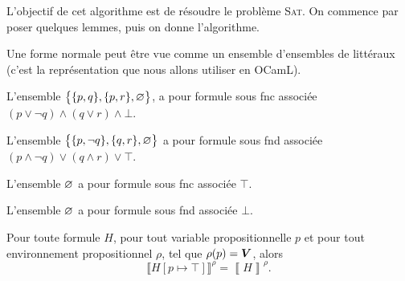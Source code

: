 L'objectif de cet algorithme est de résoudre le problème \textsc{Sat}. On commence par poser quelques lemmes, puis on donne l'algorithme.

\begin{rmk}
	Une forme normale peut être vue comme un ensemble d'ensembles de littéraux (c'est la représentation que nous allons utiliser en OCamL).
\end{rmk}

\begin{exm}\hfill
	\begin{multicols}{1}
		L'ensemble $\big\{\{p,q\},\{p,r\}, \varnothing\big\}$, a pour formule sous {\sc fnc}\/ associée $(p\lor \lnot q) \land (q \lor r) \land \bot$.

		L'ensemble $\big\{\{p,\lnot q\}, \{q,r\}, \varnothing\big\}$\/ a pour formule sous {\sc fnd}\/ associée $(p \land \lnot q) \lor (q \land r) \lor \top$.

		L'ensemble $\varnothing$\/ a pour formule sous {\sc fnc}\/ associée $\top$.

		L'ensemble $\varnothing$\/ a pour formule sous {\sc fnd}\/ associée $\bot$.
	\end{multicols}
\end{exm}

\begin{lem}
	Pour toute formule $H$, pour tout variable propositionnelle $p$ et pour tout environnement propositionnel $\rho$, tel que $\rho(p) = {\bm{V}}$, alors \[
		\Big\llbracket H[p \mapsto \top] \Big\rrbracket^\rho = \left\llbracket H \right\rrbracket^\rho
	.\]
\end{lem}
